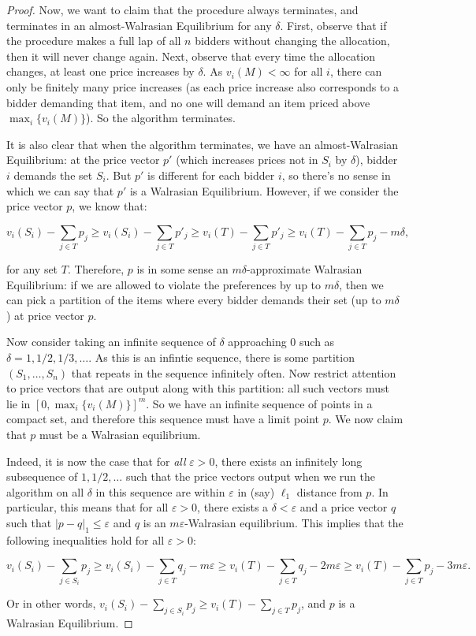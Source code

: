 \begin{proof}
Now, we want to claim that the procedure always terminates, and terminates in an almost-Walrasian Equilibrium for any $\delta$. First, observe that if the procedure makes a full lap of all $n$ bidders without changing the allocation, then it will never change again. Next, observe that every time the allocation changes, at least one price increases by $\delta$. As $v_i(M) < \infty$ for all $i$, there can only be finitely many price increases (as each price increase also corresponds to a bidder demanding that item, and no one will demand an item priced above $\max_i \{v_i(M)\}$). So the algorithm terminates.

It is also clear that when the algorithm terminates, we have an almost-Walrasian Equilibrium: at the price vector $p'$ (which increases prices not in $S_i$ by $\delta$), bidder $i$ demands the set $S_i$. But $p'$ is different for each bidder $i$, so there's no sense in which we can say that $p'$ is a Walrasian Equilibrium. However, if we consider the price vector $p$, we know that:

$$v_i(S_i) - \sum_{j \in T} p_j \geq  v_i(S_i) - \sum_{j \in T}p'_j \geq v_i(T) - \sum_{j \in T} p'_j \geq v_i(T) - \sum_{j \in T} p_j - m\delta,$$

for any set $T$. Therefore, $p$ is in some sense an $m\delta$-approximate Walrasian Equilibrium: if we are allowed to violate the preferences by up to $m\delta$, then we can pick a partition of the items where every bidder demands their set (up to $m\delta$) at price vector $p$.

Now consider taking an infinite sequence of $\delta$ approaching $0$ such as $\delta = 1, 1/2, 1/3,\ldots$. As this is an infintie sequence, there is some partition $(S_1,\ldots, S_n)$ that repeats in the sequence infinitely often. Now restrict attention to price vectors that are output along with this partition: all such vectors must lie in $[0,\max_i\{v_i(M)\}]^m$. So we have an infinite sequence of points in a compact set, and therefore this sequence must have a limit point $p$. We now claim that $p$ must be a Walrasian equilibrium.

Indeed, it is now the case that for \emph{all} $\varepsilon > 0$, there exists an infinitely long subsequence of $1, 1/2,\ldots$ such that the price vectors output when we run the algorithm on all $\delta$ in this sequence are within $\varepsilon$ in (say) $\ell_1$ distance from $p$. In particular, this means that for all $\varepsilon > 0$, there exists a $\delta < \varepsilon$ and a price vector $q$ such that $|p-q|_1 \leq \varepsilon$ and $q$ is an $m\varepsilon$-Walrasian equilibrium. This implies that the following inequalities hold for all $\varepsilon > 0$:

$$v_i(S_i) - \sum_{j \in S_i}p_j \geq v_i(S_i) - \sum_{j \in T} q_j-m\varepsilon \geq v_i(T) - \sum_{j \in T} q_j - 2m\varepsilon\geq v_i(T) - \sum_{j \in T} p_j - 3m\varepsilon.$$

Or in other words, $v_i(S_i) - \sum_{j \in S_i} p_j \geq v_i(T) - \sum_{j \in T} p_j$, and $p$ is a Walrasian Equilibrium.
\end{proof}

